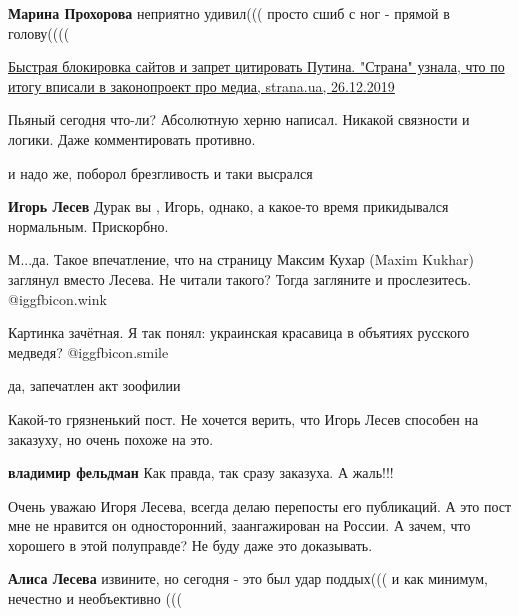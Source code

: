 \begin{itemize}
\begin{itemize} %
\textbf{Марина Прохорова} неприятно удивил((( просто сшиб с ног - прямой в голову((((
\end{itemize} %


\href{https://strana.news/news/241412-zakon-o-media-kak-sluhi-naroda-budut-zakryvat-sajty-i-shtrafovat-za-novosti-o-putine.html}{%
Быстрая блокировка сайтов и запрет цитировать Путина. "Страна" узнала, что по итогу вписали в законопроект про медиа, %
strana.ua, 26.12.2019%
}

Пьяный сегодня что-ли? Абсолютную херню написал. Никакой связности и логики. Даже комментировать противно.

\begin{itemize} %
и надо же, поборол брезгливость и таки высрался

\textbf{Игорь Лесев} Дурак вы , Игорь, однако, а какое-то время прикидывался нормальным. Прискорбно.
\end{itemize} %

М...да. Такое впечатление, что на страницу Максим Кухар (Maxim Kukhar)
заглянул вместо Лесева. Не читали такого? Тогда загляните и прослезитесь.  @igg{fbicon.wink} 

Картинка зачётная. Я так понял: украинская красавица в объятиях русского медведя?  @igg{fbicon.smile} 

\begin{itemize} %
да, запечатлен акт зоофилии
\end{itemize} %

Какой-то грязненький пост. Не хочется верить, что Игорь Лесев способен на заказуху, но очень похоже на это.

\begin{itemize} %
\textbf{владимир фельдман} Как правда, так сразу заказуха. А жаль!!!


Очень уважаю Игоря Лесева, всегда делаю перепосты его публикаций. А это пост
мне не нравится он односторонний, заангажирован на России. А зачем, что
хорошего в этой полуправде? Не буду даже это доказывать.


\textbf{Алиса Лесева} извините, но сегодня - это был удар поддых((( и как минимум, нечестно и необъективно (((
\end{itemize} %


\end{itemize}
